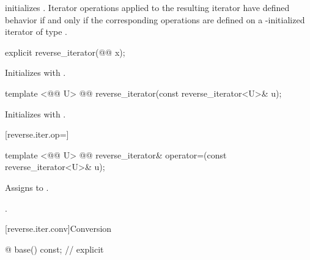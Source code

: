 \begin{itemdescr}
\pnum
\effects
{} initializes
.
Iterator operations applied to the resulting iterator have defined behavior
if and only if the corresponding operations are defined on a
-initialized iterator of type
.
\end{itemdescr}

%

\begin{itemdecl}
explicit reverse_iterator(@@ x);
\end{itemdecl}

\begin{itemdescr}
\pnum
\effects
Initializes
with .
\end{itemdescr}

%

\begin{itemdecl}
template <@@ U>
  @@
reverse_iterator(const reverse_iterator<U>& u);
\end{itemdecl}

\begin{itemdescr}
\pnum
\effects
Initializes
with
.
\end{itemdescr}

[reverse.iter.op=]{}

%
\begin{itemdecl}
template <@@ U>
  @@
reverse_iterator&
  operator=(const reverse_iterator<U>& u);
\end{itemdecl}

\begin{itemdescr}
\pnum
\effects
Assigns  to .

\pnum
\returns
{}.
\end{itemdescr}

[reverse.iter.conv]{Conversion}

%
%
\begin{itemdecl}
@ base() const;          // explicit
\end{itemdecl}

